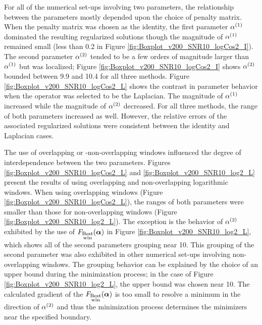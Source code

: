 \documentclass[12pt]{article}
\begin{document}
For all of the numerical set-ups involving two parameters, the relationship between the parameters mostly depended upon the choice of penalty matrix. When the penalty matrix was chosen as the identity, the first parameter $\alpha^{(1)}$ dominated the resulting regularized solutions though the magnitude of $\alpha^{(1)}$ remained small (less than 0.2 in Figure \ref{fig:Boxplot_v200_SNR10_logCos2_I}). The second parameter $\alpha^{(2)}$ tended to be a few orders of magnitude larger than $\alpha^{(1)}$ but was localized; Figure \ref{fig:Boxplot_v200_SNR10_logCos2_I} shows $\alpha^{(2)}$ bounded between 9.9 and 10.4 for all three methods. Figure \ref{fig:Boxplot_v200_SNR10_logCos2_L} shows the contrast in parameter behavior when the operator was selected to be the Laplacian. The magnitude of $\alpha^{(1)}$ increased while the magnitude of $\alpha^{(2)}$ decreased. For all three methods, the range of both parameters increased as well. However, the relative errors of the associated regularized solutions were consistent between the identity and Laplacian cases. \par
The use of overlapping or -non-overlapping windows influenced the degree of  interdependence between the two parameters. Figures \ref{fig:Boxplot_v200_SNR10_logCos2_L} and \ref{fig:Boxplot_v200_SNR10_log2_L} present the results of using overlapping and non-overlapping logarithmic windows. When using overlapping windows (Figure \ref{fig:Boxplot_v200_SNR10_logCos2_L}), the ranges of both parameters were smaller than those for non-overlapping windows (Figure \ref{fig:Boxplot_v200_SNR10_log2_L}). The exception is the behavior of $\alpha^{(2)}$ exhibited by the use of $F_{\substack{\text{Best} \\ \text{win}}}(\bm{\alpha})$ in Figure \ref{fig:Boxplot_v200_SNR10_log2_L}, which shows all of the second parameters grouping near 10. This grouping of the second parameter was also exhibited in other numerical set-ups involving non-overlapping windows. The grouping behavior can be explained by the choice of an upper bound during the minimization process; in the case of Figure \ref{fig:Boxplot_v200_SNR10_log2_L}, the upper bound was chosen near 10. The calculated gradient of the $F_{\substack{\text{Best} \\ \text{win}}}(\bm{\alpha})$ is too small to resolve a minimum in the direction of $\alpha^{(2)}$ and thus the minimization process determines the minimizers near the specified boundary. \par 
\end{document}
